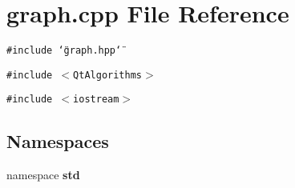 \section{graph.cpp File Reference}
\label{graph_8cpp}
{\tt \#include \char`\"{}graph.hpp\char`\"{}}\par
{\tt \#include $<$Qt\-Algorithms$>$}\par
{\tt \#include $<$iostream$>$}\par
\subsection*{Namespaces}
\begin{CompactItemize}
\item 
namespace {\bf std}
\end{CompactItemize}
